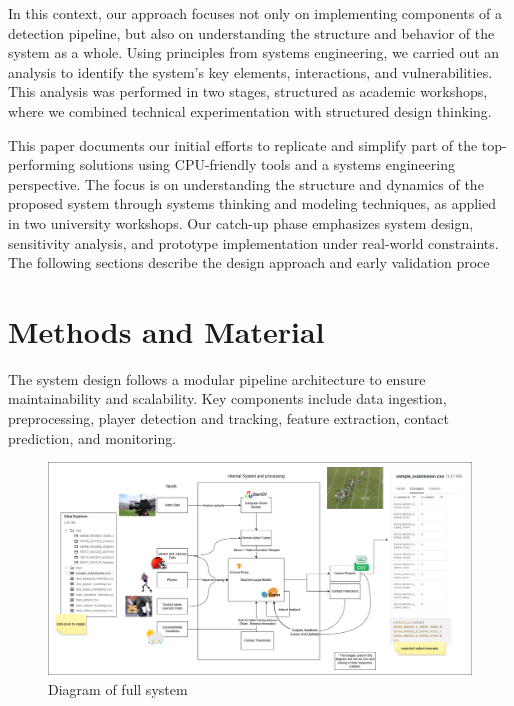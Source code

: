 \documentclass[conference]{IEEEtran}
\begin{document}
	In this context, our approach focuses not only on implementing components of a detection pipeline, but also on understanding the structure and behavior of the system as a whole. Using principles from systems engineering, we carried out an analysis to identify the system’s key elements, interactions, and vulnerabilities. This analysis was performed in two stages, structured as academic workshops, where we combined technical experimentation with structured design thinking.
	
	This paper documents our initial efforts to replicate and simplify part of the top-performing solutions using CPU-friendly tools and a systems engineering perspective. The focus is on understanding the structure and dynamics of the proposed system through systems thinking and modeling techniques, as applied in two university workshops. Our catch-up phase emphasizes system design, sensitivity analysis, and prototype implementation under real-world constraints. The following sections describe the design approach and early validation proce
	
	\section{Methods and Material}
	
	The system design follows a modular pipeline architecture to ensure maintainability and scalability. Key components include data ingestion, preprocessing, player detection and tracking, feature extraction, contact prediction, and monitoring.
	
	\begin{figure}[!t]
		\centering
		\includegraphics[width=1\textwidth]{Workshop2_diagram.png} %
		\caption{Diagram of full system}
		\label{fig:imagen_centrada}
	\end{figure}
	
\end{document}
